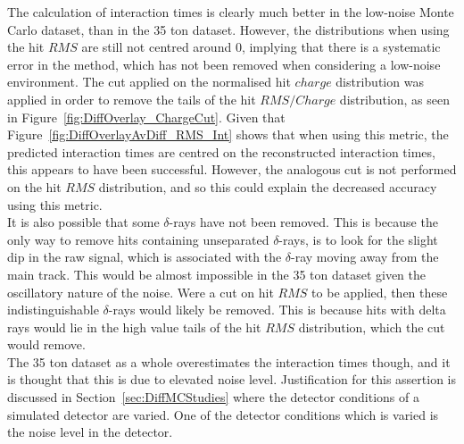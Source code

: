 The calculation of interaction times is clearly much better in the low-noise Monte Carlo dataset, than in the 35 ton dataset. However, the distributions when using the hit $RMS$ are still not centred around 0, implying that there is a systematic error in the method, which has not been removed when considering a low-noise environment. The cut applied on the normalised hit $charge$ distribution was applied in order to remove the tails of the hit $RMS/Charge$ distribution, as seen in Figure~\ref{fig:DiffOverlay_ChargeCut}. Given that Figure~\ref{fig:DiffOverlayAvDiff_RMS_Int} shows that when using this metric, the predicted interaction times are centred on the reconstructed interaction times, this appears to have been successful. However, the analogous cut is not performed on the hit $RMS$ distribution, and so this could explain the decreased accuracy using this metric. \\

It is also possible that some $\delta$-rays have not been removed. This is because the only way to remove hits containing unseparated $\delta$-rays, is to look for the slight dip in the raw signal, which is associated with the $\delta$-ray moving away from the main track. This would be almost impossible in the 35 ton dataset given the oscillatory nature of the noise. Were a cut on hit $RMS$ to be applied, then these indistinguishable $\delta$-rays would likely be removed. This is because hits with delta rays would lie in the high value tails of the hit $RMS$ distribution, which the cut would remove. \\

The 35 ton dataset as a whole overestimates the interaction times though, and it is thought that this is due to elevated noise level. Justification for this assertion is discussed in Section~\ref{sec:DiffMCStudies} where the detector conditions of a simulated detector are varied. One of the detector conditions which is varied is the noise level in the detector. \\

